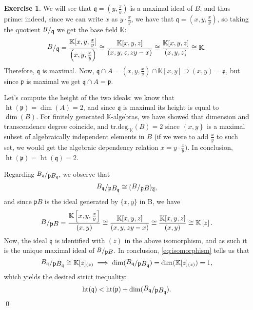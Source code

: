 \documentclass[a4paper]{article}
\newcommand{\K}{\mathbb{K}}
\newcommand{\ssfrac}[2]{
    \raisebox{+0.3ex}{$#1$}
    /
    \raisebox{-0.3ex}{$#2$}
}
\newcommand{\sfrac}[2]{
    \raisebox{+0.3ex}{\scalebox{0.9}{$#1$}}
    /
    \raisebox{-0.3ex}{\scalebox{0.9}{$#2$}}
}
\theoremstyle{definition}
\theoremstyle{definition}
\theoremstyle{remark}
\theoremstyle{definition}
\newtheorem{exercise}{Exercise}[section]
\begin{document}
\begin{exercise}
	We will see that $\mathfrak{q}=(y,\frac{x}{y})$ is a maximal ideal of $B$, and thus prime: indeed, since we can write $x$ as  $y\cdot \frac{x}{y}$, we have that $\mathfrak{q}=(x,y,\frac{x}{y})$, so
	taking the quotient $\sfrac{B}{\mathfrak{q}}$ we get the base field $\K$:
	$$\ssfrac{B}{\mathfrak{q}}=\frac{\K[x,y,\frac{x}{y}]}{\left(x,y,\frac{x}{y}\right)}\cong\frac{\K[x,y,z]}{\left( x,y,z,zy-x \right) }\cong \frac{\K[x,y,z]}{\left( x,y,z
	\right) }\cong\K.$$ Therefore, $\mathfrak{q}$ is maximal. Now, $\mathfrak{q}\cap A=(x,y,\frac{x}{y})\cap
	\K[x,y]\supseteq(x,y)=\mathfrak{p}$, but since $\mathfrak{p}$ is maximal we get $\mathfrak{q}\cap A=\mathfrak{p}.$

	Let's compute the height of the two ideals: we know that $\operatorname{ht}(\mathfrak{p})=\operatorname{dim}\left( A \right)=2$, and since $\mathfrak{q}$ is maximal its
	height is equal to $\operatorname{dim}(B)$. For finitely generated $\K$-algebras, we have showed that dimension and transcendence degree coincide, and
	$\text{tr.}\text{deg.}_{\K}(B)=2$ since $\left\{ x,y \right\} $ is a maximal subset of
	algebraically independent elements in $B$ (if we were to add $\frac{x}{y}$ to such set, we would get the algebraic dependency relation $x=y\cdot \frac{x}{y}).$ In conclusion,
	$\operatorname{ht}(\mathfrak{p})=\operatorname{ht}(\mathfrak{q})=2$.

	Regarding $\sfrac{B_{\mathfrak{q}}}{\mathfrak{p}B_{\mathfrak{q}}}$, we observe that
	\begin{equation}\label{eq:isomorphism}
		\ssfrac{B_{\mathfrak{q}}}{\mathfrak{p}B_{\mathfrak{q}}}\cong(\ssfrac{B}{\mathfrak{p}B})_{\overline{\mathfrak{q}}},
	\end{equation}
	and since $\mathfrak{p}B$ is the ideal generated by $\{x,y\}$ in B, we have
	$$ \ssfrac{B}{\mathfrak{p}B}=\frac{\K\left[x,y,\frac{x}{y}\right]}{(x,y)}\cong\frac{\K[x,y,z]}{(x,y,zy-x)}\cong\frac{\K[x,y,z]}{\left( x,y \right) }\cong\K\left[z\right] .$$
	Now, the ideal $\overline{\mathfrak{q}}$ is identified with $\left(z\right)$ in the above isomorphism, and as such it is the unique maximal ideal of $\sfrac{B}{\mathfrak{p}B}$. In conclusion,
\eqref{eq:isomorphism} tells us that $$ \ssfrac{B_{\mathfrak{q}}}{\mathfrak{p}B_{\mathfrak{q}}}\cong\K[z]_{(z)} \implies \operatorname{dim}(\ssfrac{B_{\mathfrak{q}}}{\mathfrak{p}B_{\mathfrak{q}}}) =
\operatorname{dim}(\K[z]_{(z)})=1,$$
which yields the desired strict inequality:
	$$ \operatorname{ht}(\mathfrak{q})<\operatorname{ht}(\mathfrak{p})+\operatorname{dim}(\ssfrac{B_{\mathfrak{q}}}{\mathfrak{p}B_{\mathfrak{q}}}) .$$\qed
\end{exercise}
\end{document}
